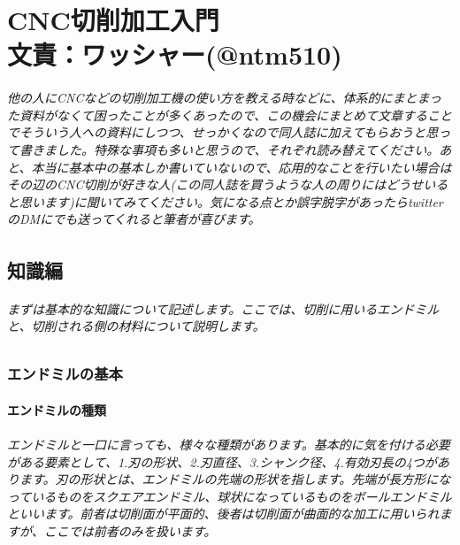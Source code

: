 \documentclass[b5paper, 9pt, twocolumn, titlepage,openany]{jsbook}%
\begin{document}
\part*{CNC切削加工入門\\文責：ワッシャー(@ntm510)}

\paragraph{他の人にCNCなどの切削加工機の使い方を教える時などに、体系的にまとまった資料がなくて困ったことが多くあったので、この機会にまとめて文章することでそういう人への資料にしつつ、せっかくなので同人誌に加えてもらおうと思って書きました。特殊な事項も多いと思うので、それぞれ読み替えてください。あと、本当に基本中の基本しか書いていないので、応用的なことを行いたい場合はその辺のCNC切削が好きな人(この同人誌を買うような人の周りにはどうせいると思います)に聞いてみてください。気になる点とか誤字脱字があったらtwitterのDMにでも送ってくれると筆者が喜びます。}

\chapter{知識編}

\paragraph{まずは基本的な知識について記述します。ここでは、切削に用いるエンドミルと、切削される側の材料について説明します。}

\section{エンドミルの基本}

\subsection{エンドミルの種類}

\paragraph{エンドミルと一口に言っても、様々な種類があります。基本的に気を付ける必要がある要素として、1.刃の形状、2.刃直径、3.シャンク径、4.有効刃長の4つがあります。刃の形状とは、エンドミルの先端の形状を指します。先端が長方形になっているものをスクエアエンドミル、球状になっているものをボールエンドミルといいます。前者は切削面が平面的、後者は切削面が曲面的な加工に用いられますが、ここでは前者のみを扱います。}
\end{document}
